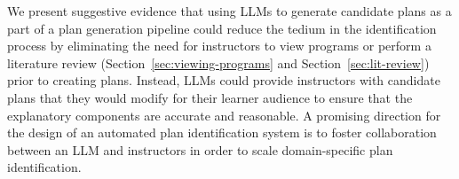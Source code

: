 
We present suggestive evidence that using LLMs to generate candidate plans as a part of a plan generation pipeline could reduce the tedium in the identification process by eliminating the need for instructors to view programs or perform a literature review (Section~\ref{sec:viewing-programs} and Section~\ref{sec:lit-review}) prior to creating plans. Instead, LLMs could provide instructors with candidate plans that they would modify for their learner audience to ensure that the explanatory components are accurate and reasonable. A promising direction for the design of an automated plan identification system is to foster collaboration between an LLM and instructors in order to scale domain-specific plan identification. 



    







